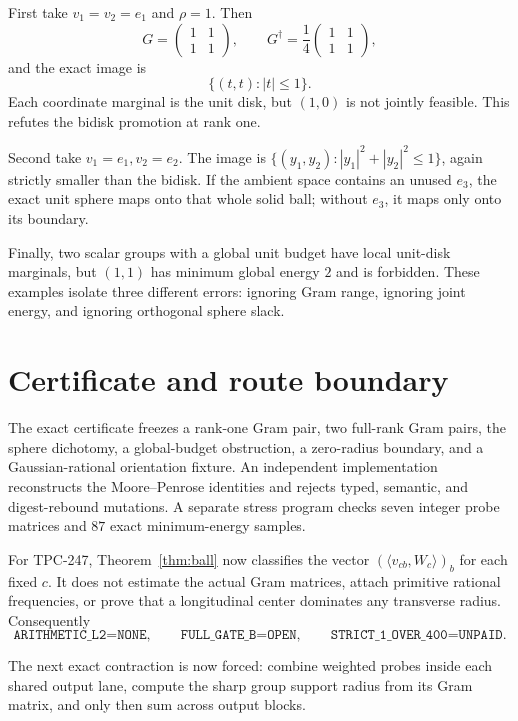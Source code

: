 \documentclass[11pt]{article}
\theoremstyle{remark}
\begin{document}
First take $v_1=v_2=e_1$ and $\rho=1$.  Then
\[
 G=\begin{pmatrix}1&1\\1&1\end{pmatrix},\qquad
 G^\dagger=\frac14\begin{pmatrix}1&1\\1&1\end{pmatrix},
\]
and the exact image is
\[
 \{(t,t):|t|\leq1\}.
\]
Each coordinate marginal is the unit disk, but $(1,0)$ is not jointly
feasible.  This refutes the bidisk promotion at rank one.

Second take $v_1=e_1,v_2=e_2$.  The image is
$\{(y_1,y_2):|y_1|^2+|y_2|^2\leq1\}$, again strictly smaller than the bidisk.
If the ambient space contains an unused $e_3$, the exact unit sphere maps onto
that whole solid ball; without $e_3$, it maps only onto its boundary.

Finally, two scalar groups with a global unit budget have local unit-disk
marginals, but $(1,1)$ has minimum global energy $2$ and is forbidden.  These
examples isolate three different errors: ignoring Gram range, ignoring joint
energy, and ignoring orthogonal sphere slack.

\section{Certificate and route boundary}

The exact certificate freezes a rank-one Gram pair, two full-rank Gram pairs,
the sphere dichotomy, a global-budget obstruction, a zero-radius boundary, and
a Gaussian-rational orientation fixture.  An independent implementation
reconstructs the Moore--Penrose identities and rejects typed, semantic, and
digest-rebound mutations.  A separate stress program checks seven integer
probe matrices and $87$ exact minimum-energy samples.

For TPC-247, Theorem~\ref{thm:ball} now classifies the vector
$(\langle v_{cb},W_c\rangle)_b$ for each fixed $c$.  It does not estimate the
actual Gram matrices, attach primitive rational frequencies, or prove that a
longitudinal center dominates any transverse radius.  Consequently
\[
 \texttt{ARITHMETIC\_L2=NONE},\qquad
 \texttt{FULL\_GATE\_B=OPEN},\qquad
 \texttt{STRICT\_1\_OVER\_400=UNPAID}.
\]

The next exact contraction is now forced: combine weighted probes inside each
shared output lane, compute the sharp group support radius from its Gram
matrix, and only then sum across output blocks.
\end{document}
